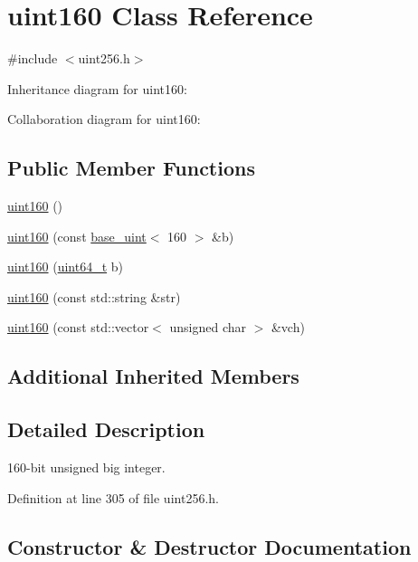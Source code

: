 \hypertarget{classuint160}{}\section{uint160 Class Reference}
\label{classuint160}


{\ttfamily \#include $<$uint256.\+h$>$}



Inheritance diagram for uint160\+:


Collaboration diagram for uint160\+:
\subsection*{Public Member Functions}
\begin{DoxyCompactItemize}
\item 
\hyperlink{classuint160_a66918f25b891415f2a9bbbb1dfdbedbd}{uint160} ()
\item 
\hyperlink{classuint160_ae0ba03a9f6b06af48b44963b3d32c2bd}{uint160} (const \hyperlink{classbase__uint}{base\+\_\+uint}$<$ 160 $>$ \&b)
\item 
\hyperlink{classuint160_a1b4399cc586066b0c61401921be5d041}{uint160} (\hyperlink{stdint_8h_aaa5d1cd013383c889537491c3cfd9aad}{uint64\+\_\+t} b)
\item 
\hyperlink{classuint160_a17be565c999f678e47d12e694446e0c4}{uint160} (const std\+::string \&str)
\item 
\hyperlink{classuint160_a92bd85c77e73d6642f9bb7519cbd480c}{uint160} (const std\+::vector$<$ unsigned char $>$ \&vch)
\end{DoxyCompactItemize}
\subsection*{Additional Inherited Members}


\subsection{Detailed Description}
160-\/bit unsigned big integer. 

Definition at line 305 of file uint256.\+h.



\subsection{Constructor \& Destructor Documentation}
\hypertarget{classuint160_a66918f25b891415f2a9bbbb1dfdbedbd}{}
